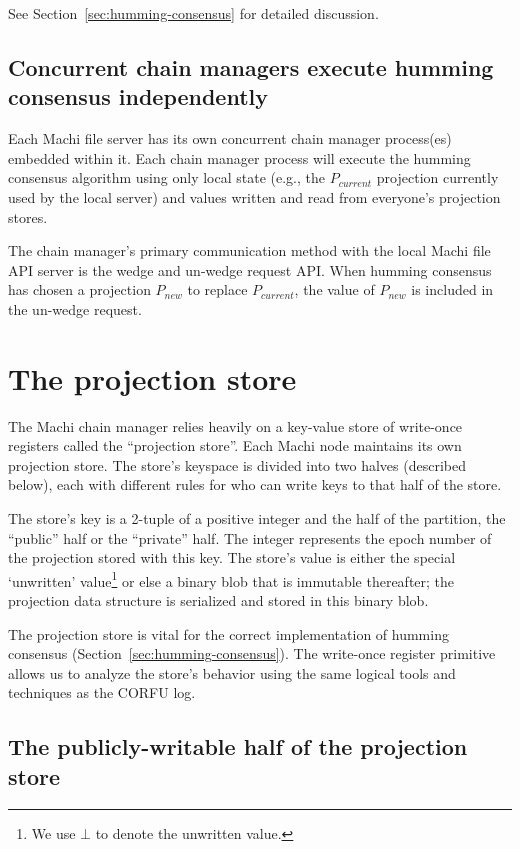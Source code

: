 \documentclass[preprint,10pt]{sigplanconf}
\begin{document}
See Section~\ref{sec:humming-consensus} for detailed discussion.

\subsection{Concurrent chain managers execute humming consensus independently}

Each Machi file server has its own concurrent chain manager
process(es) embedded within it.  Each chain manager process will
execute the humming consensus algorithm using only local state (e.g.,
the $P_{current}$ projection currently used by the local server) and
values written and read from everyone's projection stores.

The chain manager's primary communication method with the local Machi
file API server is the wedge and un-wedge request API.  When humming
consensus has chosen a projection $P_{new}$ to replace $P_{current}$,
the value of $P_{new}$ is included in the un-wedge request.

\section{The projection store}

The Machi chain manager relies heavily on a key-value store of
write-once registers called the ``projection store''.
Each Machi node maintains its own projection store.
The store's keyspace is divided into two halves (described below),
each with different rules for who can write keys to that half of the
store.

The store's key is a 2-tuple of a positive integer and the half of
the partition, the ``public'' half or the ``private'' half.
The integer represents the epoch number of the projection stored with
this key.  The
store's value is either the special `unwritten' value\footnote{We use
  $\bot$ to denote the unwritten value.} or else a binary blob that is
immutable thereafter; the projection data structure is
serialized and stored in this binary blob.

The projection store is vital for the correct implementation of humming
consensus (Section~\ref{sec:humming-consensus}).  The write-once
register primitive allows us to analyze the store's behavior
using the same logical tools and techniques as the CORFU log.

\subsection{The publicly-writable half of the projection store}
\end{document}
